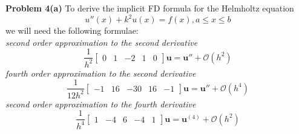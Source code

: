 \documentclass[12pt]{article}
\newcommand{\problem}[1]{\hspace{-4 ex} \large \textbf{Problem #1} }
\newcommand{\bigO}{\mathcal{O}}
\renewcommand{\vec}[1]{\boldsymbol{\mathbf{#1}}}
\begin{document}
\bigbreak

\problem{4(a)} To derive the implicit FD formula for the Helmholtz equation
$$
u''(x) + k^2 u(x) = f(x), a\leq x \leq b
$$
we will need the following formulae: \\
\textit{second order approximation to the second derivative}
$$
\frac{1}{h^2}\begin{bmatrix} 0 & 1 & -2 & 1 & 0 \end{bmatrix}\vec{u} = \vec{u}'' + \bigO(h^2)
$$
\textit{fourth order approximation to the second derivative}
$$
\frac{1}{12h^2}\begin{bmatrix} -1 & 16 & -30 & 16 & -1 \end{bmatrix}\vec{u} = \vec{u}'' + \bigO(h^4)
$$
\textit{second order approximation to the fourth derivative}
$$
\frac{1}{h^4}\begin{bmatrix} 1 & -4 & 6 & -4 & 1 \end{bmatrix}\vec{u} = \vec{u}^{(4)} + \bigO(h^2) 
$$
\end{document}
